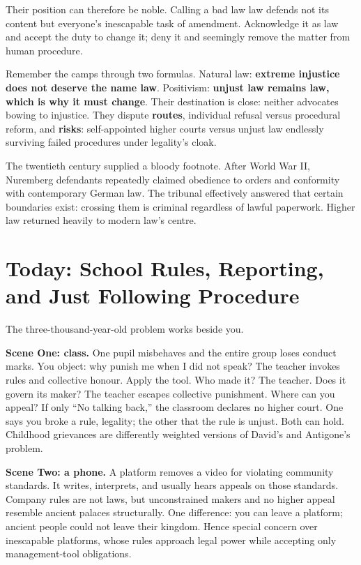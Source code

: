 Their position can therefore be noble. Calling a bad law law defends not its content but everyone's inescapable task of amendment. Acknowledge it as law and accept the duty to change it; deny it and seemingly remove the matter from human procedure.

Remember the camps through two formulas. Natural law: \textbf{extreme injustice does not deserve the name law}. Positivism: \textbf{unjust law remains law, which is why it must change}. Their destination is close: neither advocates bowing to injustice. They dispute \textbf{routes}, individual refusal versus procedural reform, and \textbf{risks}: self-appointed higher courts versus unjust law endlessly surviving failed procedures under legality's cloak.

The twentieth century supplied a bloody footnote. After World War II, Nuremberg defendants repeatedly claimed obedience to orders and conformity with contemporary German law. The tribunal effectively answered that certain boundaries exist: crossing them is criminal regardless of lawful paperwork. Higher law returned heavily to modern law's centre.

\section[Rules, Reporting, and Following Procedure]{Today: School Rules, Reporting, and Just Following Procedure}
The three-thousand-year-old problem works beside you.

\textbf{Scene One: class.} One pupil misbehaves and the entire group loses conduct marks. You object: why punish me when I did not speak? The teacher invokes rules and collective honour. Apply the tool. Who made it? The teacher. Does it govern its maker? The teacher escapes collective punishment. Where can you appeal? If only ``No talking back,'' the classroom declares no higher court. One says you broke a rule, legality; the other that the rule is unjust. Both can hold. Childhood grievances are differently weighted versions of David's and Antigone's problem.

\textbf{Scene Two: a phone.} A platform removes a video for violating community standards. It writes, interprets, and usually hears appeals on those standards. Company rules are not laws, but unconstrained makers and no higher appeal resemble ancient palaces structurally. One difference: you can leave a platform; ancient people could not leave their kingdom. Hence special concern over inescapable platforms, whose rules approach legal power while accepting only management-tool obligations.

